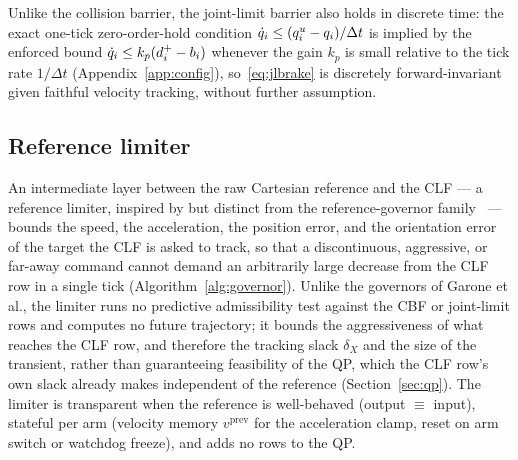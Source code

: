 Unlike the collision barrier, the joint-limit barrier also holds in discrete time: the exact one-tick zero-order-hold condition $\dot{q}_i \le (q_i^u - q_i)/\Delta t$ is implied by the enforced bound $\dot{q}_i \le k_p(d_i^+ - b_i)$ whenever the gain $k_p$ is small relative to the tick rate $1/\Delta t$ (Appendix~\ref{app:config}), so~\eqref{eq:jlbrake} is discretely forward-invariant given faithful velocity tracking, without further assumption.

\subsection{Reference limiter}
\label{sec:governor}

An intermediate layer between the raw Cartesian reference and the CLF --- a reference limiter, inspired by but distinct from the reference-governor family~\cite{garone2017} --- bounds the speed, the acceleration, the position error, and the orientation error of the target the CLF is asked to track, so that a discontinuous, aggressive, or far-away command cannot demand an arbitrarily large decrease from the CLF row in a single tick (Algorithm~\ref{alg:governor}). Unlike the governors of Garone et al., the limiter runs no predictive admissibility test against the CBF or joint-limit rows and computes no future trajectory; it bounds the aggressiveness of what reaches the CLF row, and therefore the tracking slack $\delta_X$ and the size of the transient, rather than guaranteeing feasibility of the QP, which the CLF row's own slack already makes independent of the reference (Section~\ref{sec:qp}). The limiter is transparent when the reference is well-behaved (output $\equiv$ input), stateful per arm (velocity memory $v^{\text{prev}}$ for the acceleration clamp, reset on arm switch or watchdog freeze), and adds no rows to the QP.

